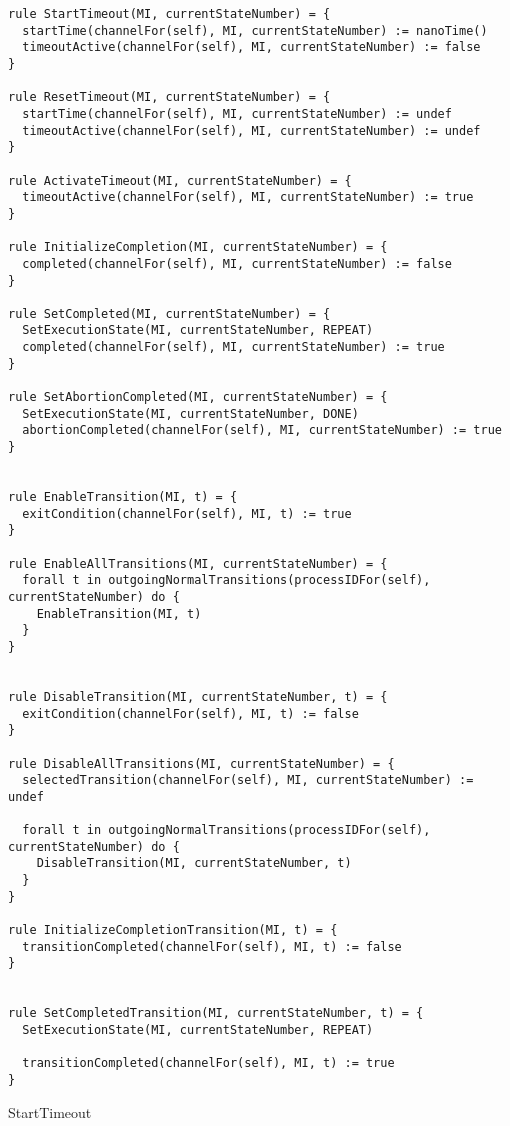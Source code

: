 \begin{listing}[H]
\begin{verbatim}
rule StartTimeout(MI, currentStateNumber) = {
  startTime(channelFor(self), MI, currentStateNumber) := nanoTime()
  timeoutActive(channelFor(self), MI, currentStateNumber) := false
}

rule ResetTimeout(MI, currentStateNumber) = {
  startTime(channelFor(self), MI, currentStateNumber) := undef
  timeoutActive(channelFor(self), MI, currentStateNumber) := undef
}

rule ActivateTimeout(MI, currentStateNumber) = {
  timeoutActive(channelFor(self), MI, currentStateNumber) := true
}

rule InitializeCompletion(MI, currentStateNumber) = {
  completed(channelFor(self), MI, currentStateNumber) := false
}

rule SetCompleted(MI, currentStateNumber) = {
  SetExecutionState(MI, currentStateNumber, REPEAT)
  completed(channelFor(self), MI, currentStateNumber) := true
}

rule SetAbortionCompleted(MI, currentStateNumber) = {
  SetExecutionState(MI, currentStateNumber, DONE)
  abortionCompleted(channelFor(self), MI, currentStateNumber) := true
}


rule EnableTransition(MI, t) = {
  exitCondition(channelFor(self), MI, t) := true
}

rule EnableAllTransitions(MI, currentStateNumber) = {
  forall t in outgoingNormalTransitions(processIDFor(self), currentStateNumber) do {
    EnableTransition(MI, t)
  }
}


rule DisableTransition(MI, currentStateNumber, t) = {
  exitCondition(channelFor(self), MI, t) := false
}

rule DisableAllTransitions(MI, currentStateNumber) = {
  selectedTransition(channelFor(self), MI, currentStateNumber) := undef

  forall t in outgoingNormalTransitions(processIDFor(self), currentStateNumber) do {
    DisableTransition(MI, currentStateNumber, t)
  }
}

rule InitializeCompletionTransition(MI, t) = {
  transitionCompleted(channelFor(self), MI, t) := false
}


rule SetCompletedTransition(MI, currentStateNumber, t) = {
  SetExecutionState(MI, currentStateNumber, REPEAT)

  transitionCompleted(channelFor(self), MI, t) := true
}
\end{verbatim}
\caption{StartTimeout}
\label{lst:asm:StartTimeout}
\end{listing}





